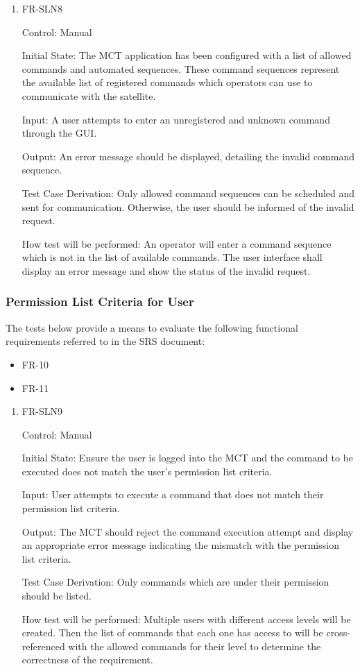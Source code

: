 \documentclass[12pt, titlepage]{article}
\begin{document}
\begin{enumerate}

\item{FR-SLN8\\}

Control: Manual
					
Initial State: The MCT application has been configured with a list of allowed commands and automated sequences. These command sequences represent the available list of registered commands which operators can use to communicate with the satellite.
					
Input: A user attempts to enter an unregistered and unknown command through the GUI.
					
Output: An error message should be displayed, detailing the invalid command sequence.

Test Case Derivation: Only allowed command sequences can be scheduled and sent for communication. Otherwise, the user should be informed of the invalid request.
					
How test will be performed: 
An operator will enter a command sequence which is not in the list of available commands. The user interface shall display an error message and show the status of the invalid request.

\end{enumerate}

\subsubsection{Permission List Criteria for User}

The tests below provide a means to evaluate the following functional requirements referred to in the SRS document:
\begin{itemize}
    \item FR-10
    \item FR-11
\end{itemize}

\begin{enumerate}

\item{FR-SLN9\\}

Control: Manual
					
Initial State: Ensure the user is logged into the MCT and the command to be executed does not match the user's permission list criteria.
	
Input: User attempts to execute a command that does not match their permission list criteria.
					
Output: The MCT should reject the command execution attempt and display an appropriate error message indicating the mismatch with the permission list criteria.

Test Case Derivation: Only commands which are under their permission should be listed.
					
How test will be performed: Multiple users with different access levels will be created. Then the list of commands that each one has access to will be cross-referenced with the allowed commands for their level to determine the correctness of the requirement.

\end{enumerate}
\end{document}
